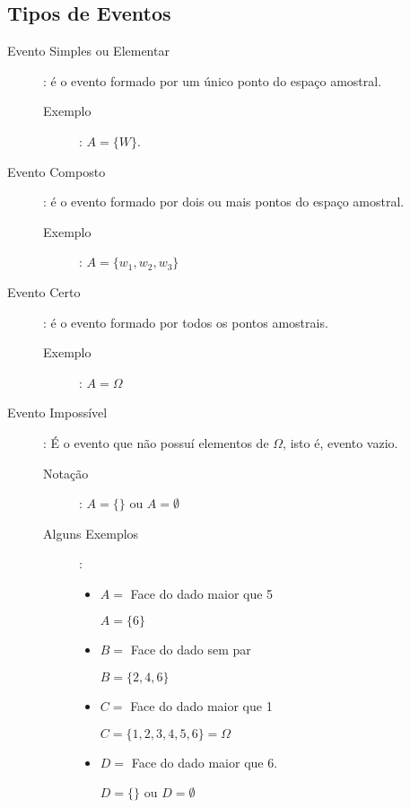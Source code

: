 \documentclass[11pt,a4paper]{book}
\begin{document}
\subsection{Tipos de Eventos}

\begin{description}
  \item [Evento Simples ou Elementar]: é o evento formado por um único ponto do espaço amostral. 
    \begin{description}
      \item [Exemplo]:
        $A=\{W\}$.
    \end{description}

  \item [Evento Composto]:  é o evento formado por dois ou mais pontos do espaço amostral.

    \begin{description}
      \item[Exemplo]:
        $ A= \{w_1,w_2,w_3 \}$
    \end{description}

  \item [Evento Certo]: é o evento formado por todos os pontos amostrais.
    \begin{description}
      \item    [Exemplo]: $A= \Omega$ 
    \end{description}
  \item [Evento Impossível]: É o evento que não possuí elementos de $\Omega$, isto é, evento vazio.
    \begin{description}
      \item [Notação]: $A=\{\}$ ou $A= \emptyset$

      \item    [Alguns Exemplos]:
        \begin{itemize}[label=]
          \item  $A=$ Face do dado maior que 5

            $A=\{6\}$

          \item    $B=$ Face do dado sem par 

            $B= \{2,4,6\}$

          \item    $C=$ Face do dado maior que 1

            $C= \{1,2,3,4,5,6\}=\Omega$

          \item        $D=$ Face do dado maior que 6.


            $D=\{ \}$ ou $D=\emptyset$
        \end{itemize}


    \end{description}
\end{description}
\end{document}
